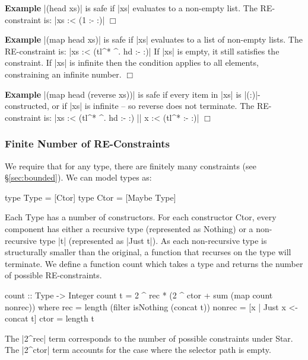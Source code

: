 \documentclass[preprint]{sigplanconf}
\newcommand{\C}[1]{\textsf{#1}}
\newcounter{exmp}
\newcommand{\yesexample}{\addtocounter{exmp}{1}\addvspace{2mm}\noindent\textbf{Example \arabic{exmp}}}
\newcommand{\noexample}{\hfill$\Box$\par\addvspace{2mm}}
\newenvironment{example}{\yesexample}{\noexample}
\begin{document}
\begin{example}
|(head xs)| is safe if |xs| evaluates to a non-empty list. The RE-constraint is: |xs :< (1 :- {:})|
\end{example}

\begin{example}
|(map head xs)| is safe if |xs| evaluates to a list of non-empty lists. The RE-constraint is: |xs :< (tl^* ^. hd :- {:})| If |xs| is empty, it still satisfies the constraint. If |xs| is infinite then the condition applies to all elements, constraining an infinite number.
\end{example}

\begin{example}
|(map head (reverse xs))| is safe if every item in |xs| is |(:)|-constructed, or if |xs| is infinite -- so \C{reverse} does not terminate. The RE-constraint is: |xs :< (tl^* ^. hd :- {:}) || x :< (tl^* :- {:})|
\end{example}

\subsubsection{Finite Number of RE-Constraints}
\label{sec:finite_re}

We require that for any type, there are finitely many constraints (see \S\ref{sec:bounded}). We can model types as:

\begin{code}
type Type  = [Ctor]
type Ctor  = [Maybe Type]
\end{code}

Each \C{Type} has a number of constructors. For each constructor \C{Ctor}, every component has either a recursive type (represented as \C{Nothing}) or a non-recursive type |t| (represented as |Just t|). As each non-recursive type is structurally smaller than the original, a function that recurses on the type will terminate. We define a function \C{count} which takes a type and returns the number of possible RE-constraints.

\begin{code}
count :: Type -> Integer
count t = 2 ^ rec * (2 ^ ctor + sum (map count nonrec))
    where
    rec = length (filter isNothing (concat t))
    nonrec = [x | Just x <- concat t]
    ctor = length t
\end{code}

The |2^rec| term corresponds to the number of possible constraints under \C{Star}. The |2^ctor| term accounts for the case where the selector path is empty.
\end{document}
